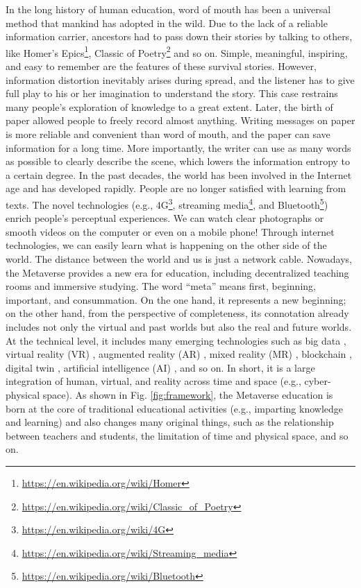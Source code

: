 \documentclass[conference]{IEEEtran}
\begin{document}
In the long history of human education, word of mouth has been a universal method that mankind has adopted in the wild. Due to the lack of a reliable information carrier, ancestors had to pass down their stories by talking to others, like Homer's Epics\footnote{\url{https://en.wikipedia.org/wiki/Homer}}, Classic of Poetry\footnote{\url{https://en.wikipedia.org/wiki/Classic_of_Poetry}} and so on. Simple, meaningful, inspiring, and easy to remember are the features of these survival stories. However, information distortion inevitably arises during spread, and the listener has to give full play to his or her imagination to understand the story. This case restrains many people's exploration of knowledge to a great extent. Later, the birth of paper allowed people to freely record almost anything. Writing messages on paper is more reliable and convenient than word of mouth, and the paper can save information for a long time. More importantly, the writer can use as many words as possible to clearly describe the scene, which lowers the information entropy to a certain degree. In the past decades, the world has been involved in the Internet age and has developed rapidly. People are no longer satisfied with learning from texts. The novel technologies (e.g., 4G\footnote{\url{https://en.wikipedia.org/wiki/4G}}, streaming media\footnote{\url{https://en.wikipedia.org/wiki/Streaming_media}}, and Bluetooth\footnote{\url{https://en.wikipedia.org/wiki/Bluetooth}}) enrich people's perceptual experiences. We can watch clear photographs or smooth videos on the computer or even on a mobile phone! Through internet technologies, we can easily learn what is happening on the other side of the world. The distance between the world and us is just a network cable. Nowadays, the Metaverse provides a new era for education, including decentralized teaching rooms and immersive studying. The word ``meta'' means first, beginning, important, and consummation. On the one hand, it represents a new beginning; on the other hand, from the perspective of completeness, its connotation already includes not only the virtual and past worlds but also the real and future worlds. At the technical level, it includes many emerging technologies such as big data \cite{sun2022big}, virtual reality (VR) \cite{hu2021virtual}, augmented reality (AR) \cite{maccallum2019teacher}, mixed reality (MR) \cite{nevelsteen2018virtual}, blockchain \cite{zheng2018blockchain,chen2021construction}, digital twin \cite{jones2020characterising}, artificial intelligence (AI) \cite{merabet2021intelligent}, and so on. In short, it is a large integration of human, virtual, and reality across time and space (e.g., cyber-physical space). As shown in Fig. \ref{fig:framework}, the Metaverse education is born at the core of traditional educational activities (e.g., imparting knowledge and learning) and also changes many original things, such as the relationship between teachers and students, the limitation of time and physical space, and so on.
\end{document}
